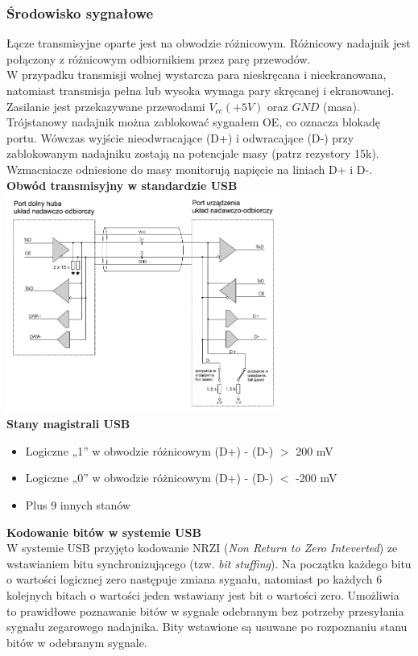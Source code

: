 		\subsubsection{Środowisko sygnałowe}
			Łącze transmisyjne oparte jest na obwodzie różnicowym. Różnicowy nadajnik jest połączony z różnicowym odbiornikiem przez parę przewodów.\\
			W przypadku transmisji wolnej wystarcza para nieskręcana i nieekranowana, natomiast transmisja pełna lub wysoka wymaga pary skręcanej i ekranowanej.\\
			Zasilanie jest przekazywane przewodami $V_{cc} (+5V)$ oraz $GND$ (masa).\\
			Trójstanowy nadajnik można zablokować sygnałem OE, co oznacza blokadę portu. Wówczas wyjście nieodwracające (D+) i odwracające (D-) przy zablokowanym nadajniku zostają na potencjale masy (patrz rezystory 15k).\\
			Wzmacniacze odniesione do masy monitorują napięcie na liniach D+ i D-.
		\newpage
			\textbf{Obwód transmisyjny w standardzie USB}\\
			\includegraphics[width=9cm]{./wyklady/USB_7_1.pdf}\\
			\textbf{Stany magistrali USB}\\
			\begin{itemize}
				\item Logiczne „1” w obwodzie różnicowym (D+) - (D-) $>$ 200 mV
				\item Logiczne „0” w obwodzie różnicowym (D+) - (D-) $<$ -200 mV
				\item Plus 9 innych stanów
			\end{itemize}
			\textbf{Kodowanie bitów w systemie USB}\\
			W systemie USB przyjęto kodowanie NRZI (\emph{Non Return to Zero Inteverted}) ze wstawianiem bitu synchronizującego (tzw. \emph{bit stuffing}). Na początku każdego bitu o wartości logicznej zero następuje zmiana sygnału, natomiast po każdych 6 kolejnych bitach o wartości jeden wstawiany jest bit o wartości zero. Umożliwia to prawidłowe poznawanie bitów w sygnale odebranym bez potrzeby przesyłania sygnału zegarowego nadajnika. Bity wstawione są usuwane po rozpoznaniu stanu bitów w odebranym sygnale.\\\\
